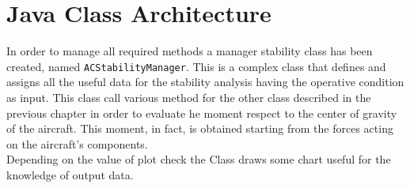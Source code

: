 \section{Java Class Architecture}
In order to manage all required methods a manager stability class has been created, named \texttt{ACStabilityManager}. This is a complex class that defines and assigns all the useful data for the stability analysis having the operative condition as input. This class call various method for the other class described in the previous chapter in order to evaluate he moment respect to the center of gravity of the aircraft. This moment, in fact, is obtained starting from the forces acting on the aircraft's components.\\
Depending on the value of plot check the Class draws some chart useful for the knowledge of output data. 
\noindent \\

